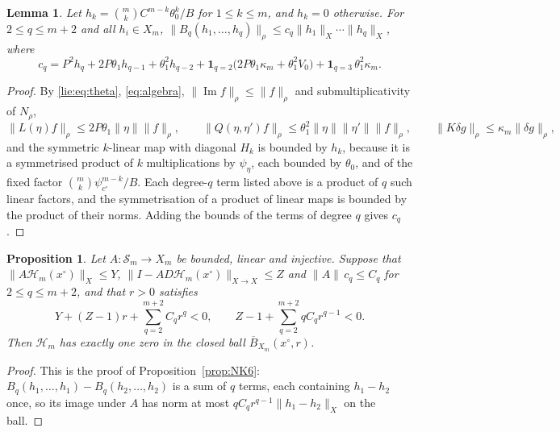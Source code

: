 \documentclass[11pt]{amsart}
\newtheorem{proposition}[theorem]{Proposition}
\newtheorem{lemma}[theorem]{Lemma}
\theoremstyle{definition}
\theoremstyle{remark}
\numberwithin{equation}{section}
\newcommand{\Sc}{\mathcal{S}}
\newcommand{\one}{\mathbf{1}}
\DeclareMathOperator{\im}{Im}
\newcommand{\nrm}[1]{\lVert #1\rVert}
\newcommand{\Hc}{\mathcal{H}}
\begin{document}
\begin{lemma}\label{lie:lem:nonlinear}
Let $h_k=\binom mkC^{m-k}\theta_0^k/B$ for $1\leq k\leq m$, and $h_k=0$ otherwise. For $2\leq q\leq m+2$ and all $h_i\in X_m$, $\nrm{B_q(h_1,\ldots,h_q)}_\rho\leq c_q\nrm{h_1}_X\cdots\nrm{h_q}_X$, where
\begin{equation}\label{lie:eq:cq}
c_q=P^2h_q+2P\theta_1h_{q-1}+\theta_1^2h_{q-2}+\one_{q=2}\big(2P\theta_1\kappa_m+\theta_1^2V_0\big)+\one_{q=3}\,\theta_1^2\kappa_m .
\end{equation}
\end{lemma}

\begin{proof}
By \eqref{lie:eq:theta}, \eqref{eq:algebra}, $\nrm{\im f}_\rho\leq\nrm f_\rho$ and submultiplicativity of $N_\rho$,
\[
\nrm{L(\eta)f}_\rho\leq2P\theta_1\nrm\eta\nrm f_\rho,\qquad\nrm{Q(\eta,\eta')f}_\rho\leq\theta_1^2\nrm\eta\nrm{\eta'}\nrm f_\rho,\qquad\nrm{K\delta g}_\rho\leq\kappa_m\nrm{\delta g}_\rho,
\]
and the symmetric $k$-linear map with diagonal $H_k$ is bounded by $h_k$, because it is a symmetrised product of $k$ multiplications by $\psi_\eta$, each bounded by $\theta_0$, and of the fixed factor $\binom mk\psi_{c^\circ}^{m-k}/B$. Each degree-$q$ term listed above is a product of $q$ such linear factors, and the symmetrisation of a product of linear maps is bounded by the product of their norms. Adding the bounds of the terms of degree $q$ gives $c_q$.
\end{proof}

\begin{proposition}\label{lie:prop:NK}
Let $A\colon\Sc_m\to X_m$ be bounded, linear and injective. Suppose that $\nrm{A\Hc_m(x^\circ)}_X\leq Y$, $\nrm{I-AD\Hc_m(x^\circ)}_{X\to X}\leq Z$ and $\nrm A\,c_q\leq C_q$ for $2\leq q\leq m+2$, and that $r>0$ satisfies
\begin{equation}\label{lie:eq:radii}
Y+(Z-1)r+\sum_{q=2}^{m+2}C_qr^q<0,\qquad Z-1+\sum_{q=2}^{m+2}qC_qr^{q-1}<0 .
\end{equation}
Then $\Hc_m$ has exactly one zero in the closed ball $\overline B_{X_m}(x^\circ,r)$.
\end{proposition}

\begin{proof}
This is the proof of Proposition~\ref{prop:NK6}: $B_q(h_1,\ldots,h_1)-B_q(h_2,\ldots,h_2)$ is a sum of $q$ terms, each containing $h_1-h_2$ once, so its image under $A$ has norm at most $qC_qr^{q-1}\nrm{h_1-h_2}_X$ on the ball.
\end{proof}
\end{document}
